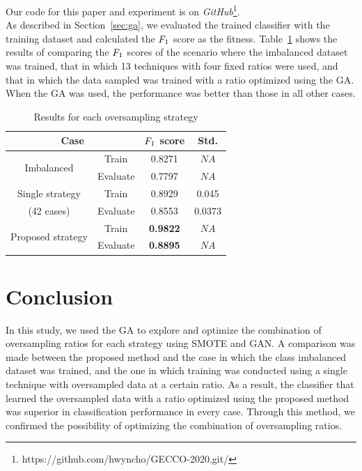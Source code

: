 Our code for this paper and experiment is on \emph{GitHub}\footnote{https://github.com/hwyncho/GECCO-2020.git/}.\\
As described in Section~\ref{sec:ga}, we evaluated the trained classifier with the training dataset and calculated the $\emph{F}_{1}$ score as the fitness.
Table~\ref{tab:1} shows the results of comparing the $\emph{F}_{1}$ scores of the scenario where the imbalanced dataset was trained, that in which 13 techniques with four fixed ratios were used, and that in which the data sampled was trained with a ratio optimized using the GA.
When the GA was used, the performance was better than those in all other cases.

\begin{table}[t]
    \centering
    \caption{Results for each oversampling strategy}
    \begin{tabular}{c|c|c|c}
        \toprule
        \multicolumn{2}{c|}{\textbf{Case}} & \textbf{$\emph{F}_{1}$ score} & \textbf{Std.} \\
        \hline
        \multirow{2}{*}{Imbalanced} & Train & 0.8271 & $NA$ \\
        & Evaluate & 0.7797 & $NA$ \\
        \hline
        Single strategy & Train & 0.8929 & 0.045 \\
        (42 cases) & Evaluate & 0.8553 & 0.0373 \\
        \hline
        \multirow{2}{*}{Proposed strategy} & Train & \textbf{0.9822} & $NA$ \\
        & Evaluate & \textbf{0.8895} & $NA$ \\
        \bottomrule
    \end{tabular}
    \label{tab:1}
\end{table}


\section{Conclusion}
\label{sec:conclusion}
In this study, we used the GA to explore and optimize the combination of oversampling ratios for each strategy using SMOTE and GAN.
A comparison was made between the proposed method and the case in which the class imbalanced dataset was trained, and the one in which training was conducted using a single technique with oversampled data at a certain ratio.
As a result, the classifier that learned the oversampled data with a ratio optimized using the proposed method was superior in classification performance in every case.
Through this method, we confirmed the possibility of optimizing the combination of oversampling ratios.
